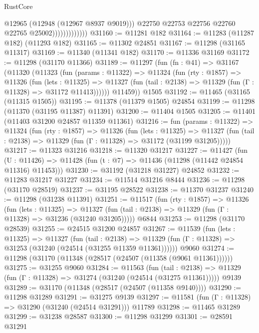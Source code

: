 \begin{lexlean}{RustCore}
\begin{coremodule}
                                @12965
                                (@12948 (@12967 @8937 @9019)))
                              @22750
                              @22753
                              @22756
                              @22760
                              @22765
                              @25002)))))))))))))
@31160 := @11281 @182
@31164 := @11283 (@11287 @182) (@11293 @182)
@31165 := @11302 @24851
@31167 := @11298 (@31165 @11317)
@31169 := @11340 (@11341 @182)
@31170 := @11336 @31169
@31172 := @11298 (@31170 @11366)
@31189 := @11297
    (fun (fn : @41) =>
    @31167
      (@11320
        (@11323
          (fun (params : @11322) =>
          @11324
            (fun (rty : @1857) =>
            @11326
              (fun (lets : @11325) =>
              @11327 (fun (tail : @2138) => @11329 (fun (Γ : @11328) => @31172 @11413))))))
        @11459))
    @1505
@31192 := @11465 (@31165 (@11315 @1505))
@31195 := @11378 (@11379 @1505) @24854
@31199 := @11298 (@11370 (@31195 @11387) @11391)
@31200 := @11404 @1505
@31205 := @11401 (@11403 @31200 @24857 @11359 @11361)
@31216 := fun (params : @11322) =>
  @11324
    (fun (rty : @1857) =>
    @11326
      (fun (lets : @11325) =>
      @11327 (fun (tail : @2138) => @11329 (fun (Γ : @11328) => @31172 (@31199 @31205)))))
@31217 := @11323 @31216
@31218 := @11320 @31217
@31227 := @11427
    (fun (U : @11426) => @11428 (fun (t : @7) => @11436 (@11298 (@11442 @24854 @11316) @11453)))
@31230 := @31192 (@31218 @31227) @24852
@31232 := @11283 @31217 @31227
@31234 := @11514 @31216 @8444
@31236 := @11298 (@31170 @28519)
@31237 := @31195 @28522
@31238 := @11370 @31237
@31240 := @11298 (@31238 @11391)
@31251 := @11517
    (fun (rty : @1857) =>
    @11326
      (fun (lets : @11325) =>
      @11327 (fun (tail : @2138) => @11329 (fun (Γ : @11328) => @31236 (@31240 @31205)))))
    @6844
@31253 := @11298 (@31170 @28539)
@31255 := @24515 @31200 @24857
@31267 := @11539
    (fun (lets : @11325) =>
    @11327
      (fun (tail : @2138) =>
      @11329 (fun (Γ : @11328) => @31253 (@31240 (@24514 (@31255 @11359 @11361))))))
    @9060
@31274 := @11298 (@31170 (@11348 (@28517 (@24507 (@11358 (@9061 @11361))))))
@31275 := @31255 @9060
@31284 := @11563
    (fun (tail : @2138) => @11329 (fun (Γ : @11328) => @31274 (@31240 (@24514 (@31275 @11361)))))
    @9139
@31289 := @31170 (@11348 (@28517 (@24507 (@11358 @9140))))
@31290 := @11298 @31289
@31291 := @31275 @9139
@31297 := @11581 (fun (Γ : @11328) => @31290 (@31240 (@24514 @31291))) @11789
@31298 := @11465 @31289
@31299 := @31238 @28587
@31300 := @11298 @31299
@31301 := @28591 @31291

\end{coremodule}
\end{lexlean}
